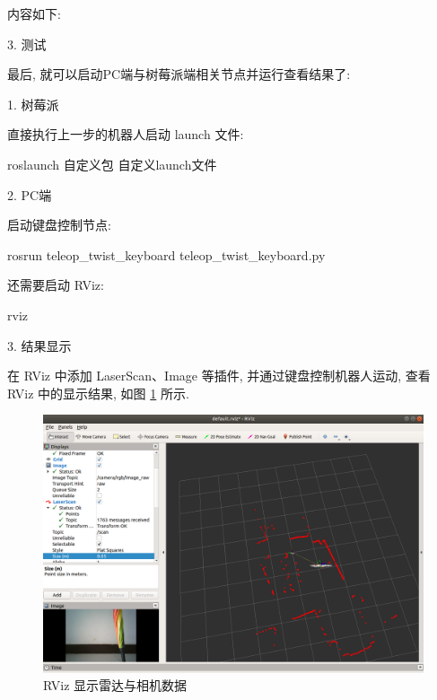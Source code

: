 \documentclass[openany, fontset=windowsold]{ctexbook}
\theoremstyle{kaiti}
\theoremstyle{normal}
\begin{document}
内容如下:


3. 测试

最后, 就可以启动PC端与树莓派端相关节点并运行查看结果了:

1. 树莓派

直接执行上一步的机器人启动 launch 文件:

\begin{bash}
  roslaunch 自定义包 自定义launch文件
\end{bash}

2. PC端

启动键盘控制节点:

\begin{bash}
  rosrun teleop_twist_keyboard teleop_twist_keyboard.py
\end{bash}

还需要启动 RViz:

\begin{bash}
  rviz
\end{bash}

3. 结果显示

在 RViz 中添加 LaserScan、Image 等插件, 并通过键盘控制机器人运动, 查看 RViz 中的显示结果, 如图 \ref{fig:rviz_show_camera_lidar} 所示.

\begin{figure}[!ht]
  \centering
  \includegraphics[width=.8\textwidth]{rviz_show_camera_lidar.png}
  \caption{RViz 显示雷达与相机数据}
  \label{fig:rviz_show_camera_lidar}
\end{figure}
\end{document}
